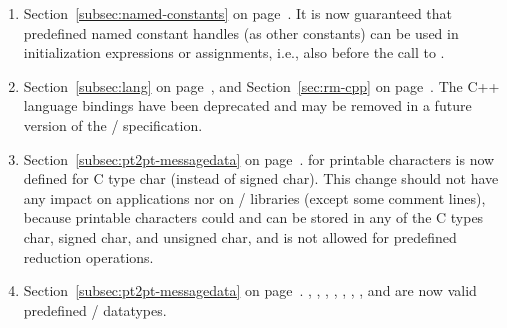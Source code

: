 \begin{enumerate}

\item 
Section~\ref{subsec:named-constants} on page~\pageref{subsec:named-constants}. 
\newline 
It is now guaranteed that predefined named constant handles (as other constants) can be used in initialization expressions or assignments, i.e., also before the call to .
 
\item
Section~\ref{subsec:lang} on page~\pageref{subsec:lang}, %
and Section~\ref{sec:rm-cpp} on page~\pageref{sec:rm-cpp}. %
\newline
The C++ language bindings have been deprecated and may be removed in a future version of the \MPI/ specification.

\item
Section~\ref{subsec:pt2pt-messagedata} on page~\pageref{subsec:pt2pt-messagedata}. %
\newline
{} for printable characters is now defined for C type char (instead of signed char). This change should not have any impact on applications nor on \MPI/ libraries (except some comment lines), because printable characters could and can be stored in any of the C types char, signed char, and unsigned char, and  is not allowed for predefined reduction operations.

\item
{}%
%
Section~\ref{subsec:pt2pt-messagedata} on page~\pageref{subsec:pt2pt-messagedata}. %
\newline
{}, 
, , , , , , and  are now valid predefined \MPI/ datatypes. 


\end{enumerate}
